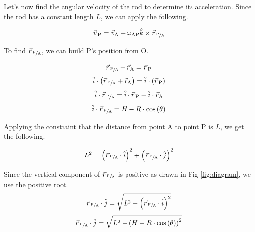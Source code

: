 \documentclass[nofoot,pdf-a,balance,colorlinks,upint,subscriptcorrection,varvw,mathalfa=cal=boondoxo]{asmeconf}
\begin{document}
    Let's now find the angular velocity of the rod to determine its acceleration. Since the rod has a constant length $L$, we can apply the following.

    \begin{equation} 
        \vec{v}_{\,\textrm{P}} = \vec{v}_{\textrm{A}} + \omega_{\textrm{AP}}\hat{k}\times \vec{r}_{\,\sfrac{\textrm{P}}{\textrm{A}}}
    \end{equation}

    To find $\vec{r}_{\,\sfrac{\textrm{P}}{\textrm{A}}}$, we can build P's position from O.

    \begin{equation}
        \vec{r}_{\,\sfrac{\textrm{P}}{\textrm{A}}} + \vec{r}_{\textrm{A}} = \vec{r}_{\,\textrm{P}}
    \end{equation}
    \begin{equation}
        \hat{i}\cdot \left(\vec{r}_{\,\sfrac{\textrm{P}}{\textrm{A}}} + \vec{r}_{\textrm{A}}\right) = \hat{i} \cdot \left(\vec{r}_{\,\textrm{P}}\right)
    \end{equation}
    \begin{equation}
        \hat{i}\cdot \vec{r}_{\,\sfrac{\textrm{P}}{\textrm{A}}} = \hat{i} \cdot \vec{r}_{\,\textrm{P}} - \hat{i} \cdot\vec{r}_{\textrm{A}} 
    \end{equation}
    \begin{equation}
        \hat{i}\cdot \vec{r}_{\,\sfrac{\textrm{P}}{\textrm{A}}} = H - R\cdot\cos{\left(\theta\right)}
    \end{equation}

    Applying the constraint that the distance from point A to point P is $L$, we get the following.

    \begin{equation} 
        L^2 = \left(\vec{r}_{\,\sfrac{\textrm{P}}{\textrm{A}}} \cdot\hat{i} \right)^2+ \left(\vec{r}_{\,\sfrac{\textrm{P}}{\textrm{A}}} \cdot\hat{j}\right)^2
    \end{equation}

    Since the vertical component of $\vec{r}_{\,\sfrac{\textrm{P}}{\textrm{A}}}$ is positive as drawn in Fig \ref{fig:diagram}, we use the positive root.
    \begin{equation} 
        \vec{r}_{\,\sfrac{\textrm{P}}{\textrm{A}}} \cdot\hat{j} = \sqrt{L^2 - \left(\vec{r}_{\,\sfrac{\textrm{P}}{\textrm{A}}} \cdot\hat{i} \right)^2}
    \end{equation}
    \begin{equation} 
        \vec{r}_{\,\sfrac{\textrm{P}}{\textrm{A}}} \cdot\hat{j} = \sqrt{L^2 - \left(H - R\cdot\cos{\left(\theta\right)}\right)^2}
    \end{equation}
\end{document}
